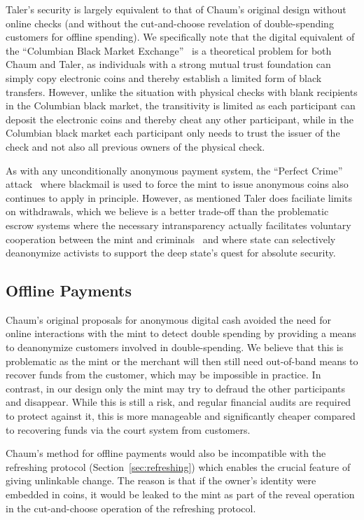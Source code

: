 \documentclass{llncs}
\begin{document}
Taler's security is largely equivalent to that of Chaum's original
design without online checks (and without the cut-and-choose
revelation of double-spending customers for offline spending).  We
specifically note that the digital equivalent of the ``Columbian Black
Market Exchange''~\cite{fatf1997} is a theoretical problem for both
Chaum and Taler, as individuals with a strong mutual trust foundation
can simply copy electronic coins and thereby establish a limited form
of black transfers.  However, unlike the situation with physical
checks with blank recipients in the Columbian black market, the
transitivity is limited as each participant can deposit the electronic
coins and thereby cheat any other participant, while in the Columbian
black market each participant only needs to trust the issuer of the
check and not also all previous owners of the physical check.

As with any unconditionally anonymous payment system, the ``Perfect
Crime'' attack~\cite{solms1992perfect} where blackmail is used to
force the mint to issue anonymous coins also continues to apply in
principle.  However, as mentioned Taler does faciliate limits on
withdrawals, which we believe is a better trade-off than the
problematic escrow systems where the necessary intransparency
actually facilitates voluntary cooperation between the mint and
criminals~\cite{sander1999escrow} and where state can selectively
deanonymize activists to support the deep state's quest for absolute
security.

\subsection{Offline Payments}

Chaum's original proposals for anonymous digital cash avoided the need
for online interactions with the mint to detect double spending by
providing a means to deanonymize customers involved in
double-spending.  We believe that this is problematic as the mint or
the merchant will then still need out-of-band means to recover funds
from the customer, which may be impossible in practice.  In contrast,
in our design only the mint may try to defraud the other participants
and disappear.  While this is still a risk, and regular financial
audits are required to protect against it, this is more manageable and
significantly cheaper compared to recovering funds via the court
system from customers.

Chaum's method for offline payments would also be incompatible with
the refreshing protocol (Section~\ref{sec:refreshing}) which enables
the crucial feature of giving unlinkable change.  The reason is that
if the owner's identity were embedded in coins, it would be leaked to
the mint as part of the reveal operation in the cut-and-choose
operation of the refreshing protocol.
\end{document}
